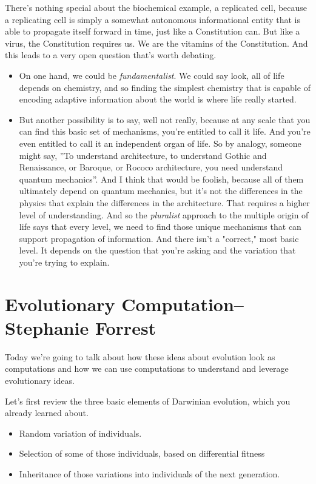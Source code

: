 \documentclass[]{article}
\begin{document}
There's nothing special about the biochemical example, a replicated cell, because a replicating cell is simply a somewhat autonomous informational entity that is able to propagate itself forward in time, just like a Constitution can.
But like a virus, the Constitution requires us. We are the vitamins of the Constitution.
And this leads to a very open question that's worth debating.
\begin{itemize}
	\item  On one hand, we could be \emph{fundamentalist}. We could say look, all of life depends on chemistry, and so finding the simplest chemistry that is capable of encoding adaptive information about the world is where life really started.
	\item But another possibility is to say, well not really, because at any scale that you can find this basic set of mechanisms, you're entitled to call it life. And you're even entitled to call it an independent organ of life. So by analogy, someone might say, ''To understand architecture, to understand Gothic and Renaissance, or Baroque, or Rococo architecture, you need understand quantum mechanics''. And I think that would be foolish, because all of them ultimately depend on quantum mechanics, but it's not the differences in the physics that explain the differences in the architecture. That requires a higher level of understanding. And so the \emph{pluralist} approach to the multiple origin of life says that every level, we need to find those unique mechanisms that can support propagation of information. And there isn't a "correct," most basic level. It depends on the question that you're asking and the variation that you're trying to explain.
\end{itemize}

\section[Evolutionary Computation]{Evolutionary Computation--Stephanie Forrest}

Today we're going to talk about how these ideas about evolution look as computations and how we can use computations to understand and leverage 
evolutionary ideas.

Let's first review the three basic elements of Darwinian evolution, which you already learned about.

\begin{itemize}
	\item Random variation of individuals.

	\item Selection of some of those individuals, based on differential fitness
	
	\item Inheritance of those variations into individuals of the next generation.
\end{itemize}
\end{document}
